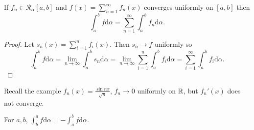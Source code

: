 \begin{corollary}
	If $f_{n} \in \mathscr{R}_{\alpha}[a,b]$ and $f(x)=\sum_{n=1}^{\infty}{f_{n}(x)}$ converges uniformly on $[a,b]$ then \[
		\int_{a}^{b}{f\mathrm{d}\alpha}=\sum_{n=1}^{\infty}{\int_{a}^{b}{f_{n}\mathrm{d}\alpha}}
		.\]
	\begin{proof}
		Let $s_{n}(x)=\sum_{i=1}^{n}{f_{i}(x)}$. Then $s_{n}\to f$ uniformly so \[
			\int_{a}^{b}{f\mathrm{d}\alpha}=\lim_{n\to \infty}{\int_{a}^{b}{s_{n}\mathrm{d}\alpha}}=\lim_{n\to \infty}{\sum_{i=1}^{n}{\int_{a}^{b}{f_{i}\mathrm{d}\alpha}}}=\sum_{i=1}^{\infty}{\int_{a}^{b}{f_{i}\mathrm{d}\alpha}}
			.\]
	\end{proof}
	\begin{note}
		Recall the example $f_{n}(x)=\frac{\sin{nx}}{\sqrt{n}}$, $f_{n}\to 0$ uniformly on $\mathbb{R}$, but $f_{n}'(x)$ does not converge.
	\end{note}
\end{corollary}
\begin{notation}
	For $a,b$, $\int_{b}^{a}{f\mathrm{d}\alpha}=-\int_{a}^{b}{f\mathrm{d}\alpha}$.
\end{notation}

